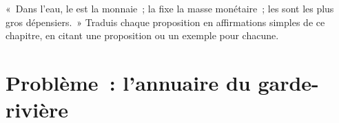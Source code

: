 \begin{exercise}[$\star\star\star$]\label{exo:g7:oxygen-in-the-water:12}
«~Dans l'eau, le  est la monnaie~; la  fixe la
masse monétaire~; les  sont les plus gros
dépensiers.~» Traduis chaque proposition en affirmations simples de
ce chapitre, en citant une proposition ou un exemple pour chacune.
\end{exercise}

\section{Problème~: l'annuaire du garde-rivière}

